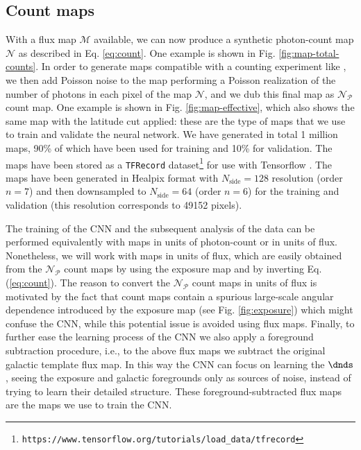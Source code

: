 \subsection{Count maps}

With a flux map $\mathcal{M}$ available, we can now produce a synthetic photon-count map $\mathcal{N}$ as described in Eq. \ref{eq:count}. 
One example is shown in Fig. \ref{fig:map-total-counts}. 
In order to generate maps compatible with a counting experiment like \fermi, we then add Poisson noise to the map performing a Poisson realization of the number of photons in each pixel of the map $\mathcal{N}$, and we dub this final map as $\mathcal{N}_\mathcal{P}$ count map. One example is shown in Fig. \ref{fig:map-effective}, which also shows the same map with the latitude cut applied: these are the type of maps that we use to train and validate the neural network. We have generated in total 1 million maps, 90\% of which have been used for training and 10\% for validation. The maps have been stored as a \verb|TFRecord| dataset\footnote{\texttt{https://www.tensorflow.org/tutorials/load\_data/tfrecord}} for use with Tensorflow \cite{tensorflow2015-whitepaper}. The maps have been generated in Healpix format with $N_\textrm{side} = 128$ resolution (order $n=7$) and then downsampled to $N_\textrm{side} = 64$ (order $n=6$) for the training and validation (this resolution corresponds to 49152 pixels). 

The training of the CNN and the subsequent analysis of the \fermi data can be performed equivalently with maps in units of photon-count or in units of flux. Nonetheless, we will work with maps in units of flux, which are easily obtained from the $\mathcal{N}_\mathcal{P}$ count maps by using the exposure map and by inverting Eq. (\ref{eq:count}).  The reason to convert the $\mathcal{N}_\mathcal{P}$ count maps in units of flux is motivated by the fact that 
count maps contain a spurious large-scale angular dependence
introduced by the exposure map (see Fig. \ref{fig:exposure}) which
might confuse the CNN, while this potential issue is avoided
using flux maps.
Finally, to further ease the learning process of the CNN
we also apply a foreground subtraction procedure,
i.e., to the above flux maps we subtract the original
galactic template flux map.
In this way the CNN can focus on learning the $\dnds$, seeing the exposure and galactic foregrounds only as sources of noise, instead of trying to learn their detailed structure. These foreground-subtracted flux maps are the maps we use to train the CNN. 

